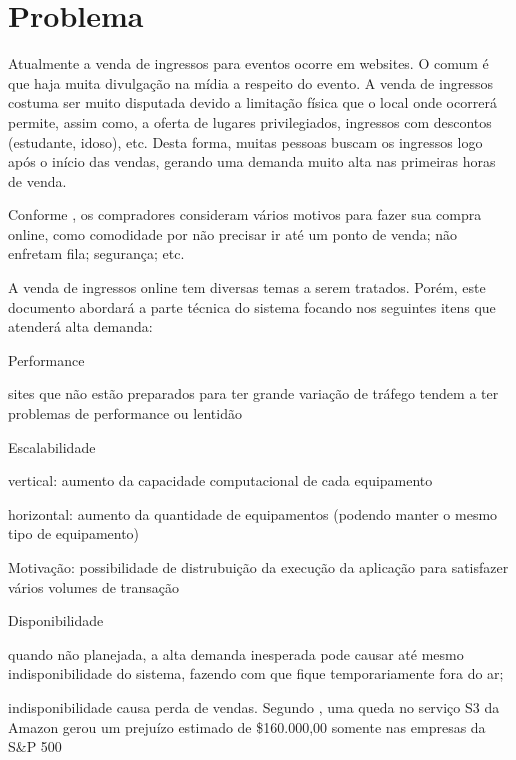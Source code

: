 \chapter{Problema}

Atualmente a venda de ingressos para eventos ocorre em websites.
O comum é que haja muita divulgação na mídia a respeito do evento.
A venda de ingressos costuma ser muito disputada devido a limitação
física que o local onde ocorrerá permite, assim como, a oferta de
lugares privilegiados, ingressos com descontos (estudante, idoso), etc.
Desta forma, muitas pessoas buscam os ingressos logo após o início das
vendas, gerando uma demanda muito alta nas primeiras horas de venda.

Conforme \cite{10-motivos-para-vender-online}, os compradores consideram
vários motivos para fazer sua compra online, como comodidade por não
precisar ir até um ponto de venda; não enfretam fila; segurança; etc.

A venda de ingressos online
tem diversas temas a serem tratados. Porém, este documento abordará a parte
técnica do sistema focando nos seguintes itens que atenderá alta demanda:

\begin{alineas}

  \item Performance

  \begin{alineas}
     \item sites que não estão preparados para ter grande variação de tráfego
           tendem a ter problemas de performance ou lentidão
  \end{alineas}

  \item Escalabilidade

  \begin{alineas}
     \item vertical: aumento da capacidade computacional de cada equipamento
     \item horizontal: aumento da quantidade de equipamentos
           (podendo manter o mesmo tipo de equipamento)
     \item Motivação: possibilidade de distrubuição da execução da aplicação para satisfazer
           vários volumes de transação \cite{arquiteturas-em-n-camadas}
  \end{alineas}

  \item Disponibilidade

  \begin{alineas}
     \item quando não planejada, a alta demanda inesperada pode causar até mesmo
           indisponibilidade do sistema, fazendo com que fique temporariamente
           fora do ar;
     \item indisponibilidade causa perda de vendas. Segundo
           \cite{disponibilidade-downtime-perdas}, uma queda no serviço S3 da
           Amazon gerou um prejuízo estimado de \$160.000,00 somente nas empresas
           da S\&P 500
  \end{alineas}

\end{alineas}
